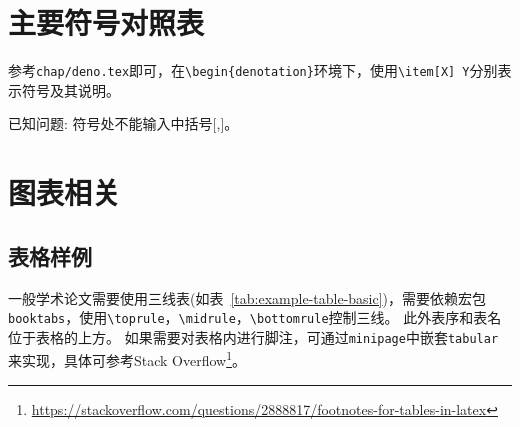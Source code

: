 \section{主要符号对照表}
\label{sec:denotation}

参考\verb|chap/deno.tex|即可，在\verb|\begin{denotation}|环境下，使用\verb|\item[X] Y|分别表示符号及其说明。

已知问题: 符号处不能输入中括号$[$,$]$。

\section{图表相关}
\label{sec:table-figure}

\subsection{表格样例}
\label{sec:table-example}

一般学术论文需要使用三线表(如表~\ref{tab:example-table-basic})，需要依赖宏包\verb|booktabs|，使用\verb|\toprule|，\verb|\midrule|，\verb|\bottomrule|控制三线。
此外表序和表名位于表格的上方。
如果需要对表格内进行脚注，可通过\texttt{minipage}中嵌套\texttt{tabular}来实现，具体可参考Stack Overflow\footnote{\url{https://stackoverflow.com/questions/2888817/footnotes-for-tables-in-latex}}。


